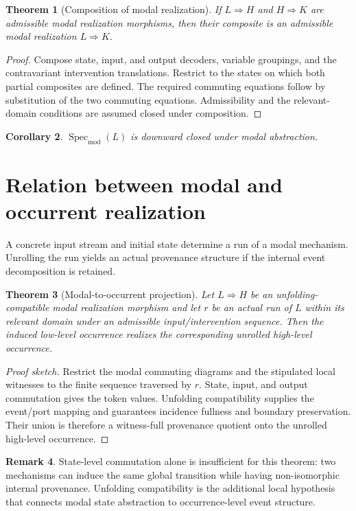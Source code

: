 \documentclass[11pt,a4paper]{article}
\theoremstyle{clean}
\newtheorem{theorem}{Theorem}[section]
\newtheorem{corollary}[theorem]{Corollary}
\theoremstyle{definition}
\newtheorem{remark}[theorem]{Remark}
\newcommand{\Spec}{\operatorname{Spec}}
\newcommand{\Mod}{\mathrm{mod}}
\begin{document}
\begin{theorem}[Composition of modal realization]
If $L\Rightarrow H$ and $H\Rightarrow K$ are admissible modal realization morphisms, then their composite is an admissible modal realization $L\Rightarrow K$.
\end{theorem}
\begin{proof}
Compose state, input, and output decoders, variable groupings, and the contravariant intervention translations. Restrict to the states on which both partial composites are defined. The required commuting equations follow by substitution of the two commuting equations. Admissibility and the relevant-domain conditions are assumed closed under composition.
\end{proof}

\begin{corollary}
$\Spec_\Mod(L)$ is downward closed under modal abstraction.
\end{corollary}

\section{Relation between modal and occurrent realization}

A concrete input stream and initial state determine a run of a modal mechanism. Unrolling the run yields an actual provenance structure if the internal event decomposition is retained.

\begin{theorem}[Modal-to-occurrent projection]
Let $L\Rightarrow H$ be an unfolding-compatible modal realization morphism and let $r$ be an actual run of $L$ within its relevant domain under an admissible input/intervention sequence. Then the induced low-level occurrence realizes the corresponding unrolled high-level occurrence.
\end{theorem}
\begin{proof}[Proof sketch]
Restrict the modal commuting diagrams and the stipulated local witnesses to the finite sequence traversed by $r$. State, input, and output commutation gives the token values. Unfolding compatibility supplies the event/port mapping and guarantees incidence fullness and boundary preservation. Their union is therefore a witness-full provenance quotient onto the unrolled high-level occurrence.
\end{proof}

\begin{remark}
State-level commutation alone is insufficient for this theorem: two mechanisms can induce the same global transition while having non-isomorphic internal provenance. Unfolding compatibility is the additional local hypothesis that connects modal state abstraction to occurrence-level event structure.
\end{remark}
\end{document}
